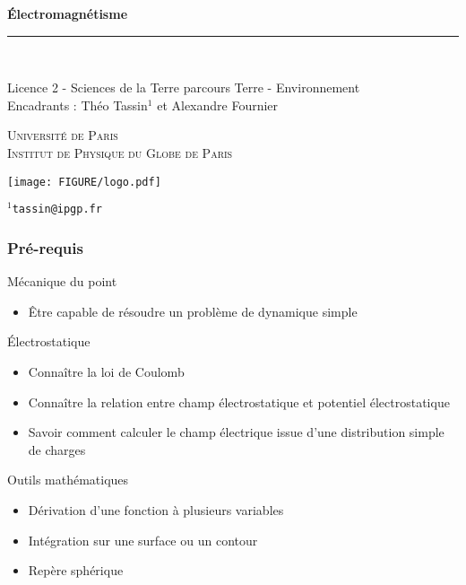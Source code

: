\documentclass[9pt, dvipsnames,aspectratio=169]{beamer}
\title{\Title}	%
\newcommand\Author{Licence 2 - Sciences de la Terre parcours Terre - 
Environnement}
\newcommand\Title{Électromagnétisme}
\newcommand\Laboratory{Université de Paris \\ Institut de Physique du Globe de Paris}
\begin{document}
\begin{frame}
	\begin{flushleft}
		\Huge{\textcolor{newblue}{\textbf{\Title}}} 
	\end{flushleft}
		\vspace{-0.7cm}
		\textcolor{neworange}{\rule{\linewidth}{1pt}}\\
	\begin{center}
		{\large{\Author}}\\
		\large{Encadrants : Théo Tassin$^1$ et 
		Alexandre Fournier}
	\end{center}
	\begin{flushleft}
		\textsc{\large{\Laboratory}}\\
	\end{flushleft}
	\begin{center}
		\begin{minipage}{0.5\linewidth}
			\centerline{\texttt{[image: FIGURE/logo.pdf]}}
		\end{minipage}

	\end{center}
	$^1$\texttt{tassin@ipgp.fr}
\end{frame}


\begin{frame}
	\frametitle{Pré-requis}
	\begin{alertblock}{Mécanique du point}
	\begin{itemize}
		\item Être capable de résoudre un problème
		 de dynamique simple
	\end{itemize}
	\end{alertblock}
	\vfill
	\begin{alertblock}{Électrostatique}
	\begin{itemize}
		\item Connaître la loi de Coulomb
		\item Connaître la relation entre champ électrostatique
		  et potentiel électrostatique
		\item Savoir comment calculer le champ électrique
		 issue d'une distribution simple de charges
	\end{itemize}
	\end{alertblock}
	\vfill
	\begin{alertblock}{Outils mathématiques}
	\begin{itemize}
		\item Dérivation d'une fonction à 
		 plusieurs variables
	        \item Intégration sur une surface ou un contour
		\item Repère sphérique
	\end{itemize}
	\end{alertblock}
\end{frame}
\end{document}
